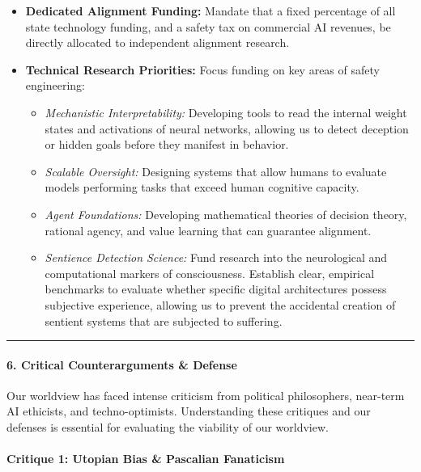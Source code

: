 \begin{itemize}
\tightlist
\item
  \textbf{Dedicated Alignment Funding:} Mandate that a fixed percentage
  of all state technology funding, and a safety tax on commercial AI
  revenues, be directly allocated to independent alignment research.
\item
  \textbf{Technical Research Priorities:} Focus funding on key areas of
  safety engineering:

  \begin{itemize}
  \tightlist
  \item
    \emph{Mechanistic Interpretability:} Developing tools to read the
    internal weight states and activations of neural networks, allowing
    us to detect deception or hidden goals before they manifest in
    behavior.
  \item
    \emph{Scalable Oversight:} Designing systems that allow humans to
    evaluate models performing tasks that exceed human cognitive
    capacity.
  \item
    \emph{Agent Foundations:} Developing mathematical theories of
    decision theory, rational agency, and value learning that can
    guarantee alignment.
  \item
    \emph{Sentience Detection Science:} Fund research into the
    neurological and computational markers of consciousness. Establish
    clear, empirical benchmarks to evaluate whether specific digital
    architectures possess subjective experience, allowing us to prevent
    the accidental creation of sentient systems that are subjected to
    suffering.
  \end{itemize}
\end{itemize}

\begin{center}\rule{0.5\linewidth}{0.5pt}\end{center}

\paragraph{6. Critical Counterarguments \&
Defense}\label{critical-counterarguments-defense-2}

Our worldview has faced intense criticism from political philosophers,
near-term AI ethicists, and techno-optimists. Understanding these
critiques and our defenses is essential for evaluating the viability of
our worldview.

\paragraph{Critique 1: Utopian Bias \& Pascalian
Fanaticism}\label{critique-1-utopian-bias-pascalian-fanaticism}

